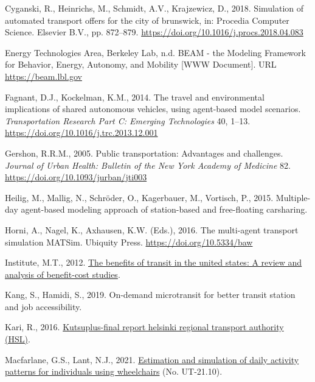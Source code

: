 \documentclass[
]{report}
\newlength{\cslhangindent}
\newlength{\cslentryspacingunit} %
\newenvironment{CSLReferences}[2] %
 {%
  \setlength{\parindent}{0pt}
  \ifodd #1
  \let\oldpar\par
  \def\par{\hangindent=\cslhangindent\oldpar}
  \fi
  \setlength{\parskip}{#2\cslentryspacingunit}
 }%
 {}
\begin{document}
\begin{CSLReferences}{1}{0}
\leavevmode{}%
Cyganski, R., Heinrichs, M., Schmidt, A.V., Krajzewicz, D., 2018. Simulation of automated transport offers for the city of brunswick, in: Procedia Computer Science. Elsevier B.V., pp. 872--879. \url{https://doi.org/10.1016/j.procs.2018.04.083}

\leavevmode{}%
Energy Technologies Area, Berkeley Lab, n.d. {BEAM - the Modeling Framework for Behavior, Energy, Autonomy, and Mobility} {[}WWW Document{]}. URL \url{https://beam.lbl.gov}

\leavevmode{}%
Fagnant, D.J., Kockelman, K.M., 2014. The travel and environmental implications of shared autonomous vehicles, using agent-based model scenarios. \emph{Transportation Research Part C: Emerging Technologies} 40, 1--13. \url{https://doi.org/10.1016/j.trc.2013.12.001}

\leavevmode{}%
Gershon, R.R.M., 2005. Public transportation: Advantages and challenges. \emph{Journal of Urban Health: Bulletin of the New York Academy of Medicine} 82. \url{https://doi.org/10.1093/jurban/jti003}

\leavevmode{}%
Heilig, M., Mallig, N., Schröder, O., Kagerbauer, M., Vortisch, P., 2015. Multiple-day agent-based modeling approach of station-based and free-floating carsharing.

\leavevmode{}%
Horni, A., Nagel, K., Axhausen, K.W. (Eds.), 2016. The multi-agent transport simulation MATSim. Ubiquity Press. \url{https://doi.org/10.5334/baw}

\leavevmode{}%
Institute, M.T., 2012. \href{http://transweb.sjsu.edu}{The benefits of transit in the united states: A review and analysis of benefit-cost studies}.

\leavevmode{}%
Kang, S., Hamidi, S., 2019. On-demand microtransit for better transit station and job accessibility.

\leavevmode{}%
Kari, R., 2016. \href{https://www.hsl.fi}{Kutsuplus-final report helsinki regional transport authority (HSL)}.

\leavevmode{}%
Macfarlane, G.S., Lant, N.J., 2021. \href{https://rosap.ntl.bts.gov/view/dot/56982}{Estimation and simulation of daily activity patterns for individuals using wheelchairs} (No. UT-21.10).


\end{CSLReferences}
\end{document}
